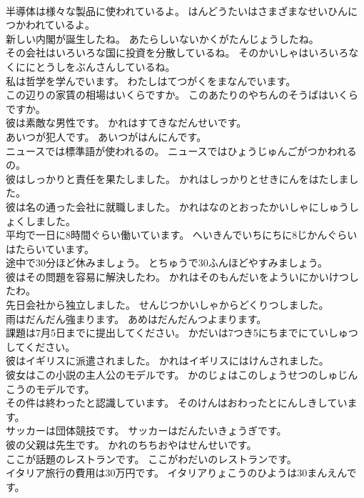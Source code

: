 \documentclass[8pt]{extreport}
\begin{document}
\begin{CJK}{UTF8}{min}
\\	半導体は様々な製品に使われているよ。	はんどうたいはさまざまなせいひんにつかわれているよ。 
\\	新しい内閣が誕生したね。	あたらしいないかくがたんじょうしたね。 
\\	その会社はいろいろな国に投資を分散しているね。	そのかいしゃはいろいろなくににとうしをぶんさんしているね。 
\\	私は哲学を学んでいます。	わたしはてつがくをまなんでいます。 
\\	この辺りの家賃の相場はいくらですか。	このあたりのやちんのそうばはいくらですか。 
\\	彼は素敵な男性です。	かれはすてきなだんせいです。 
\\	あいつが犯人です。	あいつがはんにんです。 
\\	ニュースでは標準語が使われるの。	ニュースではひょうじゅんごがつかわれるの。 
\\	彼はしっかりと責任を果たしました。	かれはしっかりとせきにんをはたしました。 
\\	彼は名の通った会社に就職しました。	かれはなのとおったかいしゃにしゅうしょくしました。 
\\	平均で一日に8時間ぐらい働いています。	へいきんでいちにちに8じかんぐらいはたらいています。 
\\	途中で30分ほど休みましょう。	とちゅうで30ふんほどやすみましょう。 
\\	彼はその問題を容易に解決したわ。	かれはそのもんだいをよういにかいけつしたわ。 
\\	先日会社から独立しました。	せんじつかいしゃからどくりつしました。 
\\	雨はだんだん強まります。	あめはだんだんつよまります。 
\\	課題は7月5日までに提出してください。	かだいは7つき5にちまでにていしゅつしてください。 
\\	彼はイギリスに派遣されました。	かれはイギリスにはけんされました。 
\\	彼女はこの小説の主人公のモデルです。	かのじょはこのしょうせつのしゅじんこうのモデルです。 
\\	その件は終わったと認識しています。	そのけんはおわったとにんしきしています。 
\\	サッカーは団体競技です。	サッカーはだんたいきょうぎです。 
\\	彼の父親は先生です。	かれのちちおやはせんせいです。 
\\	ここが話題のレストランです。	ここがわだいのレストランです。 
\\	イタリア旅行の費用は30万円です。	イタリアりょこうのひようは30まんえんです。 

\end{CJK}
\end{document}
